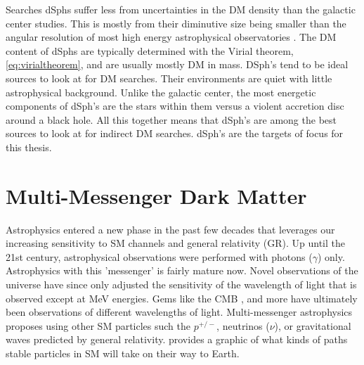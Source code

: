 Searches dSphs suffer less from uncertainties in the DM density than the galactic center studies.
This is mostly from their diminutive size being smaller than the angular resolution of most high energy astrophysical observatories \cite{Tracy:les_houches}.
The DM content of dSphs are typically determined with the Virial theorem, \cref{eq:virialtheorem}, and are usually mostly DM \cite{Tracy:les_houches} in mass.
DSph's tend to be ideal sources to look at for DM searches.
Their environments are quiet with little astrophysical background.
Unlike the galactic center, the most energetic components of dSph's are the stars within them versus a violent accretion disc around a black hole.
All this together means that dSph's are among the best sources to look at for indirect DM searches.
dSph's are the targets of focus for this thesis.

\section{Multi-Messenger Dark Matter \label{sec:mult-messengerDM}}

Astrophysics entered a new phase in the past few decades that leverages our increasing sensitivity to SM channels and general relativity (GR).
Up until the 21st century, astrophysical observations were performed with photons ($\gamma$) only.
Astrophysics with this 'messenger' is fairly mature now.
Novel observations of the universe have since only adjusted the sensitivity of the wavelength of light that is observed except at MeV energies.
Gems like the CMB \cite{Plank:CMB}, and more have ultimately been observations of different wavelengths of light.
Multi-messenger astrophysics proposes using other SM particles such the $p^{+/-}$, neutrinos ($\nu$), or gravitational waves predicted by general relativity.
 provides a graphic of what kinds of paths stable particles in SM will take on their way to Earth.

